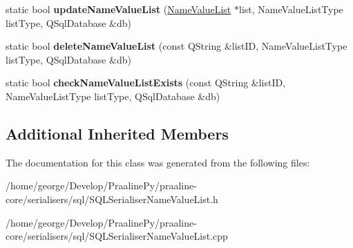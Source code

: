 \begin{DoxyCompactItemize}
static bool {\bfseries update\+Name\+Value\+List} (\hyperlink{class_name_value_list}{Name\+Value\+List} $\ast$list, Name\+Value\+List\+Type list\+Type, Q\+Sql\+Database \&db)
\item 
\mbox{\label{class_s_q_l_serialiser_name_value_list_af0fdf285d6ee05cfa650d7b3633e2ad9}} 
static bool {\bfseries delete\+Name\+Value\+List} (const Q\+String \&list\+ID, Name\+Value\+List\+Type list\+Type, Q\+Sql\+Database \&db)
\item 
\mbox{\label{class_s_q_l_serialiser_name_value_list_a71b425260adab163e7372e458946d378}} 
static bool {\bfseries check\+Name\+Value\+List\+Exists} (const Q\+String \&list\+ID, Name\+Value\+List\+Type list\+Type, Q\+Sql\+Database \&db)
\end{DoxyCompactItemize}
\subsection*{Additional Inherited Members}


The documentation for this class was generated from the following files\+:\begin{DoxyCompactItemize}
\item 
/home/george/\+Develop/\+Praaline\+Py/praaline-\/core/serialisers/sql/S\+Q\+L\+Serialiser\+Name\+Value\+List.\+h\item 
/home/george/\+Develop/\+Praaline\+Py/praaline-\/core/serialisers/sql/S\+Q\+L\+Serialiser\+Name\+Value\+List.\+cpp\end{DoxyCompactItemize}
